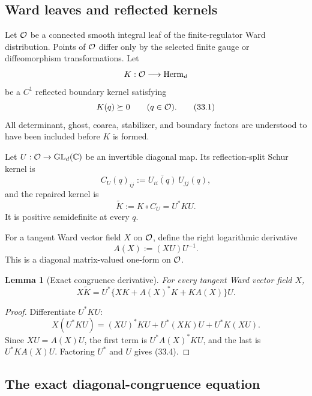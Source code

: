 \documentclass[11pt]{article}
\newtheorem{lemma}[theorem]{Lemma}
\theoremstyle{remark}
\begin{document}
\subsection{Ward leaves and reflected kernels}

Let \({\cal O}\) be a connected smooth integral leaf of the
finite-regulator Ward distribution.  Points of \({\cal O}\) differ
only by the selected finite gauge or diffeomorphism transformations.
Let
\[
 K:{\cal O}\longrightarrow{\rm Herm}_d
\]
be a \(C^1\) reflected boundary kernel satisfying
\begin{equation}
                         K(q)\succeq0
 \qquad(q\in{\cal O}).                            \tag{33.1}
\end{equation}
All determinant, ghost, coarea, stabilizer, and boundary factors are
understood to have been included before \(K\) is formed.

Let \(U:{\cal O}\to{\rm GL}_d(\mathbb C)\) be an invertible diagonal
map.  Its reflection-split Schur kernel is
\[
 C_U(q)_{ij}:=\overline{U_{ii}(q)}\,U_{jj}(q),
\]
and the repaired kernel is
\begin{equation}
 \widetilde K
 :=
 K\circ C_U
 =
 U^*KU.                                          \tag{33.2}
\end{equation}
It is positive semidefinite at every \(q\).

For a tangent Ward vector field \(X\) on \({\cal O}\), define the
right logarithmic derivative
\begin{equation}
 A(X):=(XU)U^{-1}.                                \tag{33.3}
\end{equation}
This is a diagonal matrix-valued one-form on \({\cal O}\).

\begin{lemma}[Exact congruence derivative]
\label{lem:v12v33-congruence-derivative}
For every tangent Ward vector field \(X\),
\begin{equation}
 X\widetilde K
 =
 U^*\{XK+A(X)^*K+KA(X)\}U.                       \tag{33.4}
\end{equation}
\end{lemma}

\begin{proof}
Differentiate \(U^*KU\):
\[
 X(U^*KU)
 =
 (XU)^*KU+U^*(XK)U+U^*K(XU).
\]
Since \(XU=A(X)U\), the first term is
\(U^*A(X)^*KU\), and the last is \(U^*KA(X)U\).
Factoring \(U^*\) and \(U\) gives (33.4).
\end{proof}

\subsection{The exact diagonal-congruence equation}
\end{document}
